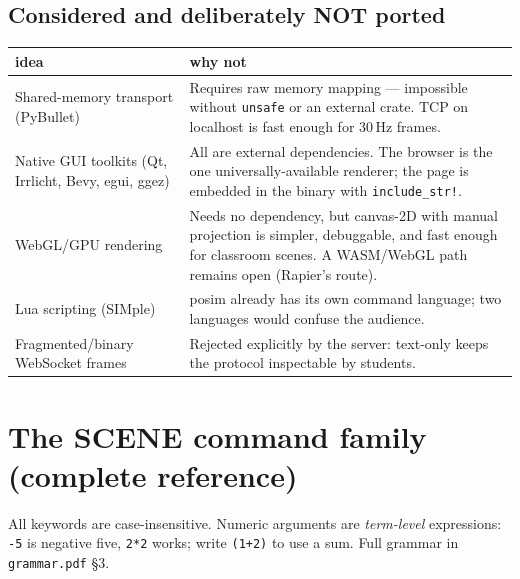 \documentclass[11pt]{article}
\newcommand{\code}[1]{\texttt{#1}}
\begin{document}
\subsection{Considered and deliberately NOT ported}

\begin{center}\small
\begin{tabular}{p{4.6cm}p{9.6cm}}
\textbf{idea} & \textbf{why not}\\\hline
Shared-memory transport (PyBullet) & Requires raw memory mapping --- impossible without \code{unsafe} or an external crate. TCP on localhost is fast enough for 30\,Hz frames.\\
Native GUI toolkits (Qt, Irrlicht, Bevy, egui, ggez) & All are external dependencies. The browser is the one universally-available renderer; the page is embedded in the binary with \code{include\_str!}.\\
WebGL/GPU rendering & Needs no dependency, but canvas-2D with manual projection is simpler, debuggable, and fast enough for classroom scenes. A WASM/WebGL path remains open (Rapier's route).\\
Lua scripting (SIMple) & posim already has its own command language; two languages would confuse the audience.\\
Fragmented/binary WebSocket frames & Rejected explicitly by the server: text-only keeps the protocol inspectable by students.\\
\end{tabular}
\end{center}

\section{The SCENE command family (complete reference)}

All keywords are case-insensitive. Numeric arguments are
\emph{term-level} expressions: \code{-5} is negative five,
\code{2*2} works; write \code{(1+2)} to use a sum. Full grammar in
\code{grammar.pdf} \S3.
\end{document}
